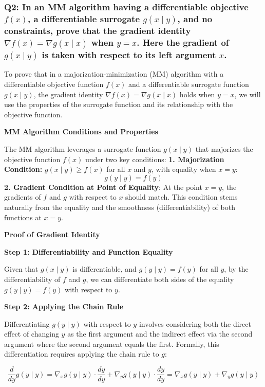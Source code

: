 \documentclass[8pt]{article}
\begin{document}
{\subsubsection*{Q2: In an MM algorithm having a differentiable objective \(f(x)\), a differentiable surrogate \(g(x \mid y)\), and no constraints, prove that the gradient identity \(\nabla f(x) = \nabla g(x \mid x)\) when \(y = x\). Here the gradient of \(g(x \mid y)\) is taken with respect to its left argument \(x\).}

To prove that in a majorization-minimization (MM) algorithm with a differentiable objective function \(f(x)\) and a differentiable surrogate function \(g(x \mid y)\), the gradient identity \(\nabla f(x) = \nabla g(x \mid x)\) holds when \(y = x\), we will use the properties of the surrogate function and its relationship with the objective function.

\textbf{MM Algorithm Conditions and Properties}

The MM algorithm leverages a surrogate function \(g(x \mid y)\) that majorizes the objective function \(f(x)\) under two key conditions:
\textbf{1. Majorization Condition:} \(g(x \mid y) \geq f(x)\) for all \(x\) and \(y\), with equality when \(x = y\):
   \[
   g(y \mid y) = f(y)
   \]
\textbf{2. Gradient Condition at Point of Equality}: At the point \(x = y\), the gradients of \(f\) and \(g\) with respect to \(x\) should match. This condition stems naturally from the equality and the smoothness (differentiability) of both functions at \(x = y\).

\textbf{Proof of Gradient Identity}

\textbf{Step 1: Differentiability and Function Equality}

Given that \(g(x \mid y)\) is differentiable, and \(g(y \mid y) = f(y)\) for all \(y\), by the differentiability of \(f\) and \(g\), we can differentiate both sides of the equality \(g(y \mid y) = f(y)\) with respect to \(y\). 

\textbf{Step 2: Applying the Chain Rule}

Differentiating \(g(y \mid y)\) with respect to \(y\) involves considering both the direct effect of changing \(y\) as the first argument and the indirect effect via the second argument where the second argument equals the first. Formally, this differentiation requires applying the chain rule to \(g\):

\[
\frac{d}{dy} g(y \mid y) = \nabla_x g(y \mid y) \cdot \frac{dy}{dy} + \nabla_y g(y \mid y) \cdot \frac{dy}{dy} = \nabla_x g(y \mid y) + \nabla_y g(y \mid y)
\]

}
\end{document}
